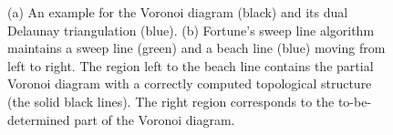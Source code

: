 \begin{figure}[htbp]

 \vspace{-0.1in}\caption{(a) An example for the Voronoi diagram
(black) and its dual Delaunay triangulation (blue). (b) Fortune's
sweep line algorithm~\cite{Fortune1986} maintains a sweep line
(green) and a beach line (blue) moving from left to right. The
region left to the beach line contains the partial Voronoi diagram
with a correctly computed topological structure (the solid black
lines). The right region corresponds to the to-be-determined part of
the Voronoi diagram. }\label{fig:voronoiexample}
\vspace{-2mm}
\end{figure}

